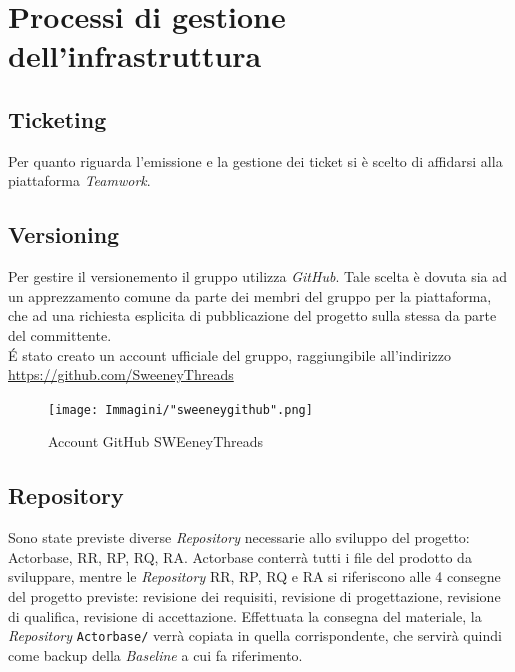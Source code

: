 \documentclass[a4paper]{report}
\begin{document}
		\section{Processi di gestione dell'infrastruttura}
			\subsection{Ticketing}	
				Per quanto riguarda l'emissione e la gestione dei ticket si è scelto di affidarsi alla piattaforma \emph{Teamwork}. 
			\subsection{Versioning}
				Per gestire il versionemento il gruppo utilizza \emph{GitHub}. Tale scelta è dovuta sia ad un apprezzamento
				comune da parte dei membri del gruppo per la piattaforma, che ad una richiesta esplicita di pubblicazione del 
				progetto sulla stessa da parte del committente. \\
				\'E stato creato un account ufficiale del gruppo, raggiungibile all'indirizzo 
				\url{https://github.com/SweeneyThreads}
				\begin{figure}[h!]
				\centering
				\texttt{[image: Immagini/"sweeneygithub".png]}
				\caption{Account GitHub SWEeneyThreads}
				\end{figure}
			\subsection{Repository}
				Sono state previste diverse \emph{Repository} necessarie allo sviluppo del progetto: Actorbase, RR, RP, RQ, RA. Actorbase conterrà tutti i file del prodotto da sviluppare, mentre
				le \emph{Repository} RR, RP, RQ e RA si riferiscono alle 4 consegne del progetto previste: revisione dei requisiti, revisione di
				progettazione, revisione di qualifica, revisione di accettazione. Effettuata la consegna del materiale, la \emph{Repository} 
				\verb|Actorbase/| verrà copiata in quella corrispondente, che servirà quindi come backup della \emph{Baseline} a cui fa riferimento.
				
\end{document}
